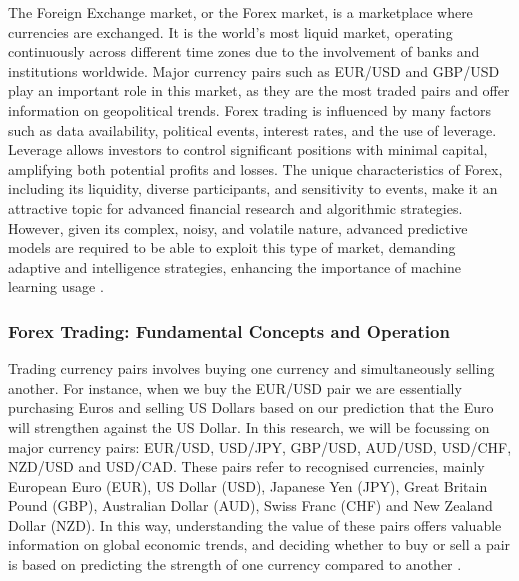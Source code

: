 The Foreign Exchange market, or the Forex market, is a marketplace where currencies are exchanged. It is the world's most liquid market, operating continuously across different time zones due to the involvement of banks and institutions worldwide. Major currency pairs such as EUR/USD and GBP/USD play an important role in this market, as they are the most traded pairs and offer information on geopolitical trends. Forex trading is influenced by many factors such as data availability, political events, interest rates, and the use of leverage. Leverage allows investors to control significant positions with minimal capital, amplifying both potential profits and losses. The unique characteristics of Forex, including its liquidity, diverse participants, and sensitivity to events, make it an attractive topic for advanced financial research and algorithmic strategies. However, given its complex, noisy, and volatile nature, advanced predictive models are required to be able to exploit this type of market, demanding adaptive and intelligence strategies, enhancing the importance of machine learning usage \cite{donnelly_art_2019}.

\subsubsection{Forex Trading: Fundamental Concepts and Operation}

Trading currency pairs involves buying one currency and simultaneously selling another. For instance, when we buy the EUR/USD pair we are essentially purchasing Euros and selling US Dollars based on our prediction that the Euro will strengthen against the US Dollar. In this research, we will be focussing on major currency pairs: EUR/USD, USD/JPY, GBP/USD, AUD/USD, USD/CHF, NZD/USD and USD/CAD. These pairs refer to recognised currencies, mainly European Euro (EUR), US Dollar (USD), Japanese Yen (JPY), Great Britain Pound (GBP), Australian Dollar (AUD), Swiss Franc (CHF) and New Zealand Dollar (NZD). In this way, understanding the value of these pairs offers valuable information on global economic trends, and deciding whether to buy or sell a pair is based on predicting the strength of one currency compared to another \cite{donnelly_art_2019}.

